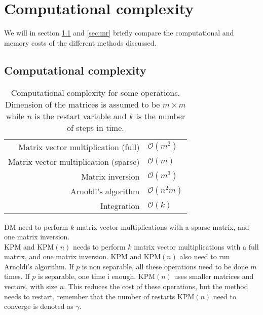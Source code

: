 \chapter{Computational complexity}%
\label{sec:comp}
We will in section \ref{sec:cc} and \ref{sec:mr} briefly compare the computational and memory costs of the different methods discussed.%
\section{Computational complexity} \label{sec:cc}
\begin{table}[H]
\centering
\begin{tabular}{r | l}
 Matrix vector multiplication (full) & $\mathcal{O}(m^2)$ \cite{complex} \\
 Matrix vector multiplication (sparse) & $\mathcal{O}(m)$ \cite{complex} \\
 Matrix inversion  & $ \mathcal{O}(m^3)$ \cite{complex} \\
 Arnoldi's algorithm & $ \mathcal{O}(n^2 m)$ \cite{saad} \\
 Integration & $\mathcal{O}(k)$
\end{tabular}
\caption{Computational complexity for some operations. Dimension of the matrices is assumed to be $m \times m$ while $n$ is the restart variable and $k$ is the number of steps in time.}
\label{tab:runtime}
\end{table}
DM need to perform $k$ matrix vector multiplications with a sparse matrix, and one matrix inversion. \\

KPM and KPM$(n)$ needs to perform $k$ matrix vector multiplications with a full matrix, and one matrix inversion. KPM and KPM$(n)$ also need to run Arnoldi's algorithm. If $p$ is non separable, all these operations need to be done $m$ times. If $p$ is separable, one time i enough. KPM$(n)$ uses smaller matrices and vectors, with size $n$. This reduces the cost of these operations, but the method needs to restart, remember that the number of restarts KPM$(n)$ need to converge is denoted as  $\gamma$. %

